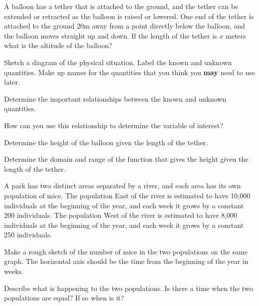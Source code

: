 \begin{problem}
\item A balloon has a tether that is attached to the ground, and the
  tether can be extended or retracted as the balloon is raised or
  lowered. One end of the tether is attached to the ground 20m away
  from a point directly below the balloon, and the balloon moves
  straight up and down. If the length of the tether is $x$ meters what
  is the altitude of the balloon?
  \begin{subproblem}
    \item Sketch a diagram of the physical situation. Label the known and
      unknown quantities. Make up names for the quantities that you
      think you \textbf{may} need to use later.
      \vfill
      \vfill
    \item Determine the important relationships between the known and
      unknown quantities.
      \vfill
    \item How can you use this relationship to determine the variable
      of interest?
      \vfill
    \item Determine the height of the balloon given the length of the
      tether.
      \vfill
    \item Determine the domain and range of the function that gives
      the height given the length of the tether.
      \vfill
  \end{subproblem}

  \clearpage

\item A park has two distinct areas separated by a river, and each
  area has its own population of mice.  The population East of the
  river is estimated to have 10,000 individuals at the beginning of
  the year, and each week it grows by a constant 200 individuals. The
  population West of the river is estimated to have 8,000 individuals
  at the beginning of the year, and each week it grows by a constant
  250 individuals.

  \begin{subproblem}
  \item Make a rough sketch of the number of mice in the two
    populations on the same graph. The horizontal axis should be the
    time from the beginning of the year in weeks.
    \vfill

  \item Describe what is happening to the two populations. Is there a
    time when the two populations are equal? If so when is it?
    \vfill


\end{subproblem}
\end{problem}
